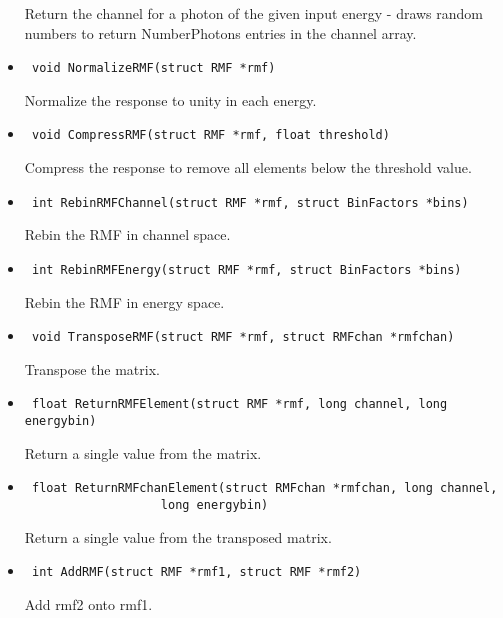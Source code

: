 \documentclass[11pt]{book}
\begin{document}
\begin{itemize}
               Return the channel for a photon of the given input 
               energy - draws random numbers to return NumberPhotons 
               entries in the channel array.

\item      \begin{verbatim} void NormalizeRMF(struct RMF *rmf)\end{verbatim}

               Normalize the response to unity in each energy.

\item      \begin{verbatim} void CompressRMF(struct RMF *rmf, float threshold)\end{verbatim}

               Compress the response to remove all elements 
               below the threshold value.

\item      \begin{verbatim} int RebinRMFChannel(struct RMF *rmf, struct BinFactors *bins)\end{verbatim}

               Rebin the RMF in channel space.

\item      \begin{verbatim} int RebinRMFEnergy(struct RMF *rmf, struct BinFactors *bins)\end{verbatim}

               Rebin the RMF in energy space.

\item      \begin{verbatim} void TransposeRMF(struct RMF *rmf, struct RMFchan *rmfchan)\end{verbatim}

               Transpose the matrix.

\item      \begin{verbatim} float ReturnRMFElement(struct RMF *rmf, long channel, long energybin)\end{verbatim}

               Return a single value from the matrix.

\item      \begin{verbatim} float ReturnRMFchanElement(struct RMFchan *rmfchan, long channel, 
                   long energybin)\end{verbatim}

               Return a single value from the transposed matrix.

\item      \begin{verbatim} int AddRMF(struct RMF *rmf1, struct RMF *rmf2)\end{verbatim}

               Add rmf2 onto rmf1.

\end{itemize}
\end{document}

